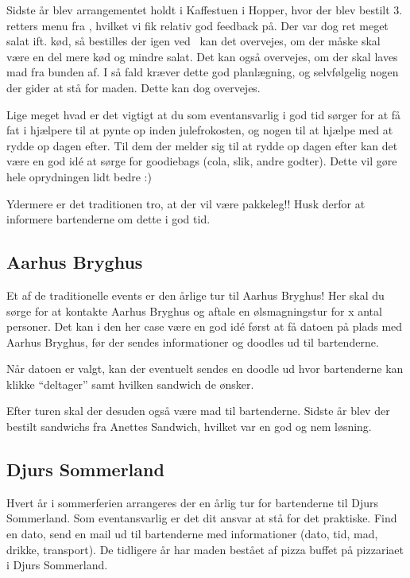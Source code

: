 Sidste år blev arrangementet holdt i Kaffestuen i Hopper, hvor der
blev bestilt 3. retters menu fra \fotex, hvilket vi fik relativ god
feedback på. Der var dog ret meget salat ift. kød, så bestilles der
igen ved \fotex\ kan det overvejes, om der måske skal være en del mere
kød og mindre salat. Det kan også overvejes, om der skal laves mad fra
bunden af. I så fald kræver dette god planlægning, og selvfølgelig
nogen der gider at stå for maden. Dette kan dog overvejes.

Lige meget hvad er det vigtigt at du som eventansvarlig i god tid
sørger for at få fat i hjælpere til at pynte op inden julefrokosten,
og nogen til at hjælpe med at rydde op dagen efter. Til dem der melder
sig til at rydde op dagen efter kan det være en god idé at sørge for
goodiebags (cola, slik, andre godter). Dette vil gøre hele oprydningen
lidt bedre :)

Ydermere er det traditionen tro, at der vil være pakkeleg!! Husk
derfor at informere bartenderne om dette i god tid.

\subsection{Aarhus Bryghus}
\label{sec:aarhus-bryghus}

Et af de traditionelle events er den årlige tur til Aarhus Bryghus!
Her skal du sørge for at kontakte Aarhus Bryghus og aftale en
ølsmagningstur for x antal personer. Det kan i den her case være en
god idé først at få datoen på plads med Aarhus Bryghus, før der sendes
informationer og doodles ud til bartenderne.

Når datoen er valgt, kan der eventuelt sendes en doodle ud hvor
bartenderne kan klikke ``deltager'' samt hvilken sandwich de ønsker.

Efter turen skal der desuden også være mad til bartenderne. Sidste år
blev der bestilt sandwichs fra Anettes Sandwich, hvilket var en god og
nem løsning.

\subsection{Djurs Sommerland}
\label{sec:djurs-sommerland}

Hvert år i sommerferien arrangeres der en årlig tur for bartenderne
til Djurs Sommerland. Som eventansvarlig er det dit ansvar at stå for
det praktiske. Find en dato, send en mail ud til bartenderne med
informationer (dato, tid, mad, drikke, transport). De tidligere år har
maden bestået af pizza buffet på pizzariaet i Djurs Sommerland.

